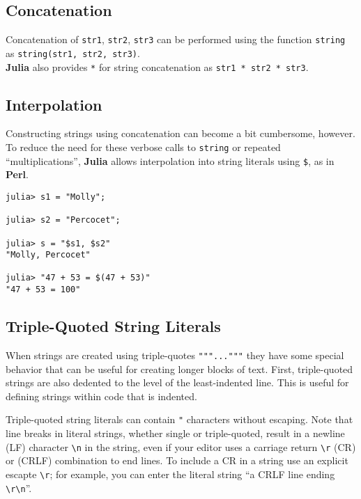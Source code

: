 \documentclass[
]{article}
\begin{document}
\hypertarget{concatenation}{%
\subsection{Concatenation}\label{concatenation}}

Concatenation of \texttt{str1}, \texttt{str2}, \texttt{str3} can be
performed using the function \texttt{string} as
\texttt{string(str1,\ str2,\ str3)}.\\
\textbf{Julia} also provides \texttt{*} for string concatenation as
\texttt{str1\ *\ str2\ *\ str3}.

\hypertarget{interpolation}{%
\subsection{Interpolation}\label{interpolation}}

Constructing strings using concatenation can become a bit cumbersome,
however. To reduce the need for these verbose calls to \texttt{string}
or repeated ``multiplications'', \textbf{Julia} allows interpolation
into string literals using \texttt{\$}, as in \textbf{Perl}.

\begin{verbatim}
julia> s1 = "Molly";

julia> s2 = "Percocet";

julia> s = "$s1, $s2"
"Molly, Percocet"

julia> "47 + 53 = $(47 + 53)"
"47 + 53 = 100"
\end{verbatim}

\hypertarget{triple-quoted-string-literals}{%
\subsection{Triple-Quoted String
Literals}\label{triple-quoted-string-literals}}

When strings are created using triple-quotes \texttt{"""..."""} they have some special behavior that can be useful for
creating longer blocks of text. First, triple-quoted strings are also
dedented to the level of the least-indented line. This is useful for
defining strings within code that is indented.

Triple-quoted string literals can contain \texttt{"} characters without escaping.
Note that line breaks in literal strings, whether single or
triple-quoted, result in a newline (LF) character
\texttt{\textbackslash{}n} in the string, even if your editor uses a
carriage return \texttt{\textbackslash{}r} (CR) or (CRLF) combination to
end lines. To include a CR in a string use an explicit escapte
\texttt{\textbackslash{}r}; for example, you can enter the literal
string ``a CRLF line ending
\texttt{\textbackslash{}r\textbackslash{}n}''.
\end{document}
